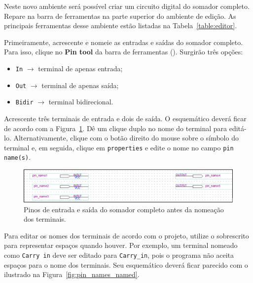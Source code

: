 \documentclass[12pt,a4paper]{article}
\begin{document}
\vspace{12pt}

Neste novo ambiente será possível criar um circuito digital do somador completo. Repare na barra de ferramentas na parte superior do ambiente de edição. As principais ferramentas desse ambiente estão listadas na Tabela~\ref{table:editor}.

Primeiramente, acrescente e nomeie as entradas e saídas do somador completo. Para isso, clique no \textbf{Pin tool} da barra de ferramentas (). Surgirão três opções:

\begin{itemize}
    \item \texttt{In} $\rightarrow$ terminal de apenas entrada;
    \item \texttt{Out} $\rightarrow$ terminal de apenas saída;
    \item \texttt{Bidir} $\rightarrow$ terminal bidirecional.
\end{itemize}

Acrescente três terminais de entrada e dois de saída. O esquemático deverá ficar de acordo com a Figura~\ref{fig:pin_names}. Dê um clique duplo no nome do terminal para editá-lo. Alternativamente, clique com o botão direito do mouse sobre o símbolo do terminal e, em seguida, clique em \texttt{properties} e edite o nome no campo \texttt{pin name(s)}.


\begin{figure}[htbp!]
    \centering
    \includegraphics[width=\textwidth]{./figs/pin_names.png}
    \caption{Pinos de entrada e saída do somador completo antes da nomeação dos terminais.}
    \label{fig:pin_names}
\end{figure}

Para editar os nomes dos terminais de acordo com o projeto, utilize o sobrescrito para representar espaços quando houver. Por exemplo, um terminal nomeado como \texttt{Carry in} deve ser editado para \texttt{Carry\_in}, pois o programa não aceita espaços para o nome dos terminais. Seu esquemático deverá ficar parecido com o ilustrado na Figura~\ref{fig:pin_names_named}.
\end{document}
